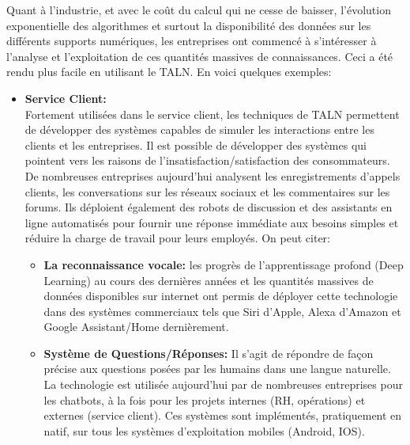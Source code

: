 Quant à l'industrie, et avec le coût du calcul qui ne cesse de baisser, l'évolution exponentielle des algorithmes et surtout la disponibilité des données sur les différents supports numériques, les entreprises ont commencé à s'intéresser à l'analyse et l'exploitation de ces quantités massives de connaissances. Ceci a été rendu plus facile en utilisant le TALN. En voici quelques exemples: 
\begin{itemize}
    \item \textbf{Service Client:}\\
    Fortement utilisées dans le service client, les techniques de TALN permettent de développer des systèmes capables de simuler les interactions entre les clients et les entreprises. Il est possible de développer des systèmes qui pointent vers les raisons de l'insatisfaction/satisfaction des consommateurs.\\
    De nombreuses entreprises aujourd'hui analysent les enregistrements d'appels clients, les conversations sur les réseaux sociaux et les commentaires sur les forums. Ils déploient également des robots de discussion et des assistants en ligne automatisés pour fournir une réponse immédiate aux besoins simples et réduire la charge de travail pour leurs employés. On peut citer: 
    \begin{itemize}
        \item \textbf{La reconnaissance vocale:} les progrès de l'apprentissage profond (Deep Learning) au cours des dernières années et les quantités massives de données disponibles sur internet ont permis de déployer cette technologie dans des systèmes commerciaux tels que Siri d'Apple, Alexa d'Amazon et Google Assistant/Home dernièrement.
        \item \textbf{Système de Questions/Réponses:} Il s'agit de répondre de façon précise aux questions posées par les humains dans une langue naturelle. La technologie est utilisée aujourd'hui par de nombreuses entreprises pour les chatbots, à la fois pour les projets internes (RH, opérations) et externes (service client). Ces systèmes sont implémentés, pratiquement en natif, sur tous les systèmes d'exploitation mobiles (Android, IOS).\\
    \end{itemize}


\end{itemize}
